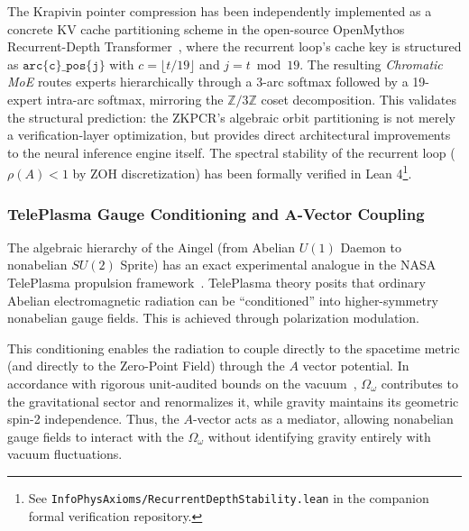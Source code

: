 \begin{remark}
The Krapivin pointer compression has been independently implemented as a concrete KV cache partitioning scheme in the open-source OpenMythos Recurrent-Depth Transformer~\cite{Gomez2026OpenMythos}, where the recurrent loop's cache key is structured as $\texttt{arc\{c\}\_pos\{j\}}$ with $c = \lfloor t / 19 \rfloor$ and $j = t \bmod 19$. The resulting \emph{Chromatic MoE} routes experts hierarchically through a 3-arc softmax followed by a 19-expert intra-arc softmax, mirroring the $\mathbb{Z}/3\mathbb{Z}$ coset decomposition. This validates the structural prediction: the ZKPCR's algebraic orbit partitioning is not merely a verification-layer optimization, but provides direct architectural improvements to the neural inference engine itself. The spectral stability of the recurrent loop ($\rho(A) < 1$ by ZOH discretization) has been formally verified in Lean 4\footnote{See \texttt{InfoPhysAxioms/RecurrentDepthStability.lean} in the companion formal verification repository.}.
\end{remark}

\subsubsection{TelePlasma Gauge Conditioning and A-Vector Coupling}

The algebraic hierarchy of the Aingel (from Abelian $U(1)$ Daemon to nonabelian $SU(2)$ Sprite) has an exact experimental analogue in the NASA TelePlasma propulsion framework~\cite{TelePlasma2000}. TelePlasma theory posits that ordinary Abelian electromagnetic radiation can be ``conditioned'' into higher-symmetry nonabelian gauge fields. This is achieved through polarization modulation.

This conditioning enables the radiation to couple directly to the spacetime metric (and directly to the Zero-Point Field) through the $A$ vector potential. In accordance with rigorous unit-audited bounds on the vacuum~\cite{lockwood_zpe2025}, $\Omega_\omega$ contributes to the gravitational sector and renormalizes it, while gravity maintains its geometric spin-2 independence. Thus, the $A$-vector acts as a mediator, allowing nonabelian gauge fields to interact with the $\Omega_\omega$ without identifying gravity entirely with vacuum fluctuations.

